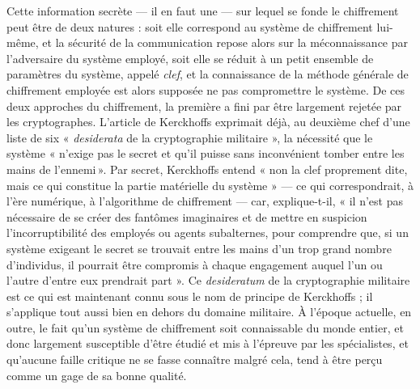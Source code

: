 



Cette information secrète --- il en faut une --- sur lequel se fonde le chiffrement peut être de deux natures : soit elle
correspond au système de chiffrement lui-même, et la sécurité de la communication repose alors
sur la méconnaissance par l’adversaire du système employé, soit elle se réduit à un petit ensemble de
paramètres du système, appelé \emph{clef}, et la connaissance de la méthode générale de chiffrement
employée est alors supposée ne pas compromettre le système.
De ces deux approches du chiffrement, la première a fini par être largement rejetée par les
cryptographes.
L’article de Kerckhoffs exprimait déjà, au deuxième chef d’une liste de six « \emph{desiderata} de
la cryptographie militaire », la nécessité que le système « n’exige pas le secret et qu’il puisse
sans inconvénient tomber entre les mains de l’ennemi ».
Par secret, Kerckhoffs entend « non la clef proprement dite, mais ce qui constitue la partie
matérielle du système » --- ce qui correspondrait, à l’ère numérique, à l'algorithme de chiffrement
--- car, explique-t-il, « il n’est pas nécessaire de se créer des fantômes imaginaires et de mettre
en suspicion l’incorruptibilité des employés ou agents subalternes, pour comprendre que, si un
système exigeant le secret se trouvait entre les mains d’un trop grand nombre d’individus, il
pourrait être compromis à chaque engagement auquel l’un ou l’autre d’entre eux prendrait part ».
Ce \emph{desideratum} de la cryptographie militaire est ce qui est maintenant connu sous le nom de
principe de Kerckhoffs ; il s’applique tout aussi bien en dehors du domaine militaire.
À l’époque actuelle, en outre, le fait qu’un système de
chiffrement soit connaissable du monde entier, et donc largement susceptible d’être étudié et mis à
l’épreuve par les spécialistes, et qu’aucune faille critique ne se fasse connaître malgré cela, tend
à être perçu comme un gage de sa bonne qualité.

